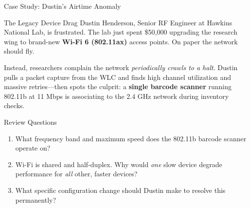 \documentclass[aspectratio=169]{beamer}
\begin{document}
\begin{frame}{Case Study: Dustin's Airtime Anomaly}
    \begin{casestudy}{The Legacy Device Drag}
        \footnotesize
        Dustin Henderson, Senior RF Engineer at Hawkins National Lab, is frustrated. The lab just spent \$50{,}000 upgrading the research wing to brand-new \textbf{Wi-Fi 6 (802.11ax)} access points. On paper the network should fly.

        \vspace{0.3em}
        Instead, researchers complain the network \emph{periodically crawls to a halt}. Dustin pulls a packet capture from the WLC and finds high channel utilization and massive retries---then spots the culprit: a \textbf{single barcode scanner} running 802.11b at 11 Mbps is associating to the 2.4 GHz network during inventory checks.
    \end{casestudy}

    \begin{block}{Review Questions}
        \footnotesize
        \begin{enumerate}
            \item What frequency band and maximum speed does the 802.11b barcode scanner operate on?
            \item Wi-Fi is shared and half-duplex. Why would \emph{one} slow device degrade performance for \emph{all} other, faster devices?
            \item What specific configuration change should Dustin make to resolve this permanently?
        \end{enumerate}
    \end{block}
\end{frame}
\end{document}
